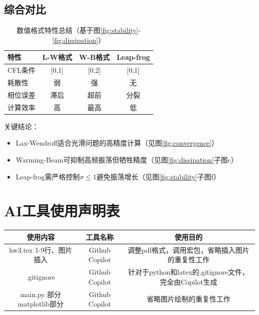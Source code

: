 \documentclass[UTF8]{ctexart}
\begin{document}
\subsection{综合对比}
\begin{table}[htbp]
    \centering
    \caption{数值格式特性总结（基于图\ref{fig:stability}-\ref{fig:dissipation}）}
    \begin{tabular}{l|ccc}
    特性         & L-W格式 & W-B格式 & Leap-frog \\ \hline
    CFL条件      & [0,1]   & [0,2]   & [0,1]     \\
    耗散性       & 弱      & 强      & 无        \\
    相位误差     & 滞后    & 超前    & 分裂      \\
    计算效率     & 高      & 最高     & 低        \\
    \end{tabular}
\end{table}

关键结论：
\begin{itemize}
    \item Lax-Wendroff适合光滑问题的高精度计算（见图\ref{fig:convergence}）
    \item Warming-Beam可抑制高频振荡但牺牲精度（见图\ref{fig:dissipation}子图c）
    \item Leap-frog需严格控制$\sigma\leq1$避免振荡增长（见图\ref{fig:stability}子图f）
\end{itemize}
\newpage
\appendix
\section{AI工具使用声明表}
\begin{table}[H]
    \centering
    \begin{tabular}{c|c|c}
        \hline
        使用内容 & 工具名称 & 使用目的 \\ \hline
        hw3.tex 1-9行、图片插入 & Github Copilot & 调整pdf格式，调用宏包，省略插入图片的重复性工作 \\ 
        .gitignore & Github Copilot & 针对于python和latex的.gitignore文件，完全由Copilot生成  \\
        main.py 部分matplotlib部分 & Github Copilot & 省略图片绘制的重复性工作
    \end{tabular}
    \label{tab:AI_tools}
\end{table}
\end{document}
